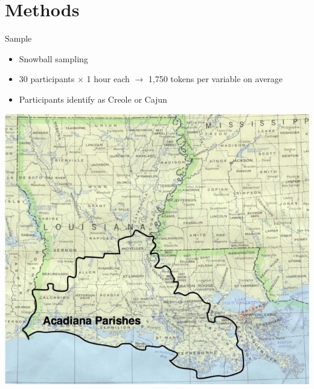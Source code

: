 \documentclass{beamer}\usepackage[]{graphicx}\usepackage[]{xcolor}
\begin{document}
  \section{Methods}
    \begin{frame}{Sample}
      \begin{itemize}
        \item Snowball sampling \parencite{brown_pronominal_1988, giancarlo_dont_2019, rottet_language_1995}
        \item 30 participants $\times$ 1 hour each $\to$ 1,750 tokens per variable on average
        \item Participants identify as Creole or Cajun
      \end{itemize}
      \begin{center}
        \includegraphics[scale=0.2]{acadiana.jpg}
      \end{center}
    \end{frame}
\end{document}
